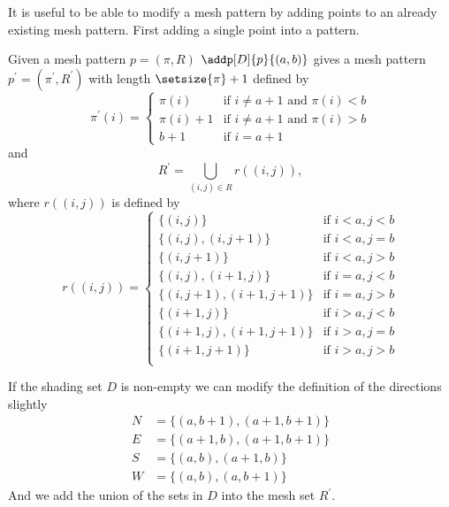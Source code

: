 It is useful to be able to modify a mesh pattern by adding points to an
already existing mesh pattern. First adding a single point into a pattern.
\begin{definition}
Given a mesh pattern \(p = (\pi,R)\) \(\addp[D]{p}{(a,b)}\) gives a mesh
pattern \(p^\prime = (\pi^\prime,R^\prime)\) with length \(\setsize{\pi}+1\) defined by
\begin{equation*}
    \pi^\prime(i) = \begin{cases}
    \pi(i) & \text{if } i\neq a+1 \text{ and } \pi(i)<b\\
    \pi(i)+1 & \text{if } i\neq a+1 \text{ and } \pi(i)>b\\
    b+1 & \text{if } i = a+1
\end{cases}
\end{equation*}
and
\begin{equation*}
        R^\prime = \bigcup_{(i,j)\in R}r((i,j)),
\end{equation*}
where \(r((i,j))\) is defined by
\begin{equation*}
    r((i,j)) =
    \begin{cases}
        \{(i,j)\} & \text{if } i<a, j<b\\
        \{(i,j),(i,j+1)\} & \text{if } i<a, j=b\\
        \{(i,j+1)\} & \text{if } i<a, j>b\\
        \{(i,j),(i+1,j)\} & \text{if } i=a, j<b\\
        \{(i,j+1),(i+1,j+1)\} & \text{if } i=a, j>b\\
        \{(i+1,j)\} & \text{if } i>a, j<b\\
        \{(i+1,j),(i+1,j+1)\} & \text{if } i>a, j=b\\
        \{(i+1,j+1)\} &\text{if } i>a, j>b\\
    \end{cases}
\end{equation*}

If the shading set \(D\) is non-empty we can modify the definition of the directions
slightly
\begin{equation*}
    \begin{aligned}
        N &= \{(a,b+1),(a+1,b+1)\} \\
        E &= \{(a+1,b),(a+1,b+1)\} \\
        S &= \{(a,b),(a+1,b)\} \\
        W &= \{(a,b),(a,b+1)\}
    \end{aligned}
\end{equation*}
And we add the union of the sets in \(D\) into the mesh set \(R^\prime\).
\end{definition}

